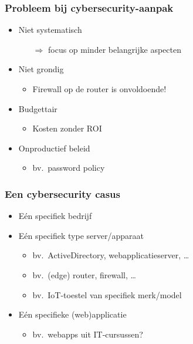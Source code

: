 \documentclass[aspectratio=169]{beamer}
\begin{document}
\begin{frame}
  \frametitle{Probleem bij cybersecurity-aanpak}

  \begin{itemize}
    \item Niet systematisch
          \begin{itemize}
            \item[$\Rightarrow$] focus op minder belangrijke aspecten
          \end{itemize}
    \item Niet grondig
          \begin{itemize}
            \item Firewall op de router is onvoldoende!
          \end{itemize}
    \item Budgettair
          \begin{itemize}
            \item Kosten zonder ROI
          \end{itemize}
    \item Onproductief beleid
          \begin{itemize}
            \item bv.\ password policy
          \end{itemize}
  \end{itemize}

\end{frame}

\begin{frame}
  \frametitle{Een cybersecurity casus}

  \begin{itemize}
    \item Eén specifiek bedrijf
    \item Eén specifiek type server/apparaat
          \begin{itemize}
            \item bv.\ ActiveDirectory, webapplicatieserver, \ldots
            \item bv.\ (edge) router, firewall, \ldots
            \item bv.\ IoT-toestel van specifiek merk/model
          \end{itemize}
    \item Eén specifieke (web)applicatie
          \begin{itemize}
            \item bv.\ webapps uit IT-cursussen?
          \end{itemize}
  \end{itemize}

\end{frame}
\end{document}
